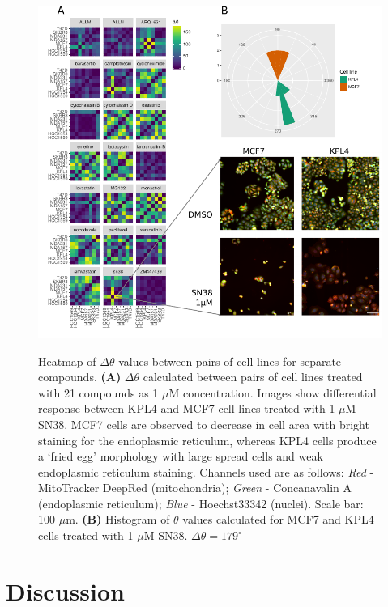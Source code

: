 \documentclass[a4paper,11pt,twoside,openright]{scrbook}
\begin{document}
\begin{figure}
    \captionsetup{width=0.8\textwidth}
    \caption[Heatmap of $\Delta\theta$ between pairs of cell lines for separate compounds]{
Heatmap of $\Delta\theta$ values between pairs of cell lines for separate compounds.
\textbf{(A)} $\Delta\theta$ calculated between pairs of cell lines treated with 21 compounds as 1 $\mu$M concentration.
Images show differential response between KPL4 and MCF7 cell lines treated with 1 $\mu$M SN38.
    MCF7 cells are observed to decrease in cell area with bright staining for the endoplasmic reticulum, whereas KPL4 cells produce a `fried egg' morphology with large spread cells and weak endoplasmic reticulum staining. Channels used are as follows: \textit{Red} - MitoTracker DeepRed (mitochondria); \textit{Green} - Concanavalin A (endoplasmic reticulum); \textit{Blue} - Hoechst33342 (nuclei). Scale bar: 100 $\mu$m.
\textbf{(B)} Histogram of $\theta$ values calculated for MCF7 and KPL4 cells treated with 1 $\mu$M SN38. $\Delta\theta = 179^\circ$
}
    \includegraphics[scale=1.0]{figs/ch3theta24}
    \label{figure:theta_24}
\end{figure}



\section{Discussion}
\end{document}
